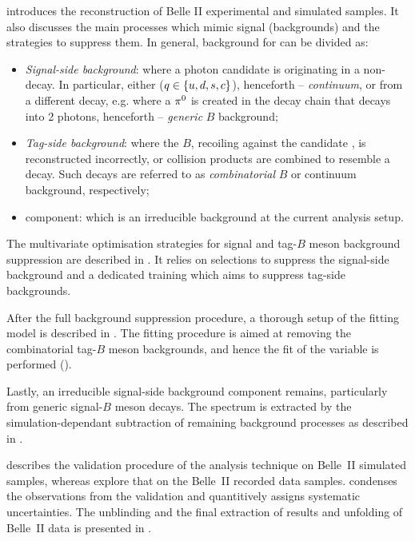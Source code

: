  introduces the reconstruction of Belle II experimental and simulated \BtoXsgamma samples.
It also discusses the main processes which mimic \BtoXsgamma signal (backgrounds) and the strategies to suppress them.
In general, background for \BtoXsgamma can be divided as:
\begin{itemize}
    \item \textit{Signal-side background}: where a photon candidate is originating in a non-\BtoXsgamma decay.
    In particular, either \epem\ra\qqbar ($q\in\{u,d,s,c\}$), henceforth -- \textit{continuum}, or from a different \B decay, e.g. where a $\pi^0$ is created in the decay chain that decays into 2 photons, henceforth -- \textit{generic} $B$ background;
    \item \textit{Tag-side background}: where the $B$, recoiling against the candidate \BtoXsgamma, is reconstructed incorrectly, or \epem\ra\qqbar collision products are combined to resemble a \B decay.
    Such decays are referred to as \textit{combinatorial} $B$ or continuum background, respectively;
    \item \BtoXdgamma component: which is an irreducible background at the current analysis setup. 
\end{itemize}

The
multivariate optimisation strategies for signal and tag-$B$ meson background suppression are described in 
.
It relies on selections to suppress the signal-side background and a dedicated \BDT training which aims to suppress tag-side backgrounds.

After the full background suppression procedure, a thorough setup of the fitting model is described in .
The fitting procedure is aimed at removing the combinatorial tag-$B$ meson backgrounds, and hence the fit of the \Mbc variable is performed ().

Lastly, an irreducible signal-side background component remains, particularly from generic signal-$B$ meson decays.
The \EB spectrum is extracted by the simulation-dependant subtraction of remaining background processes as described in .

 describes the validation procedure of the analysis technique on Belle~II simulated samples,
whereas  explore that on the Belle~II recorded data samples.
 condenses the observations from the validation and quantitively assigns systematic uncertainties.
The unblinding and the final extraction of results and unfolding of Belle~II data is presented in .
